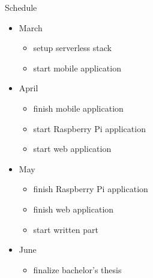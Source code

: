 \documentclass[aspectratio=169]{beamer}
\begin{document}
  \begin{frame}{Schedule}
    \begin{itemize}
      \item March
        \begin{itemize}
          \item setup serverless stack
          \item start mobile application
        \end{itemize}
      \item April
        \begin{itemize}
          \item finish mobile application
          \item start Raspberry Pi application
          \item start web application
        \end{itemize}
      \item May
        \begin{itemize}
          \item finish Raspberry Pi application
          \item finish web application
          \item start written part
        \end{itemize}
      \item June
        \begin{itemize}
          \item finalize bachelor’s thesis
        \end{itemize}
    \end{itemize}
  \end{frame}
\end{document}
